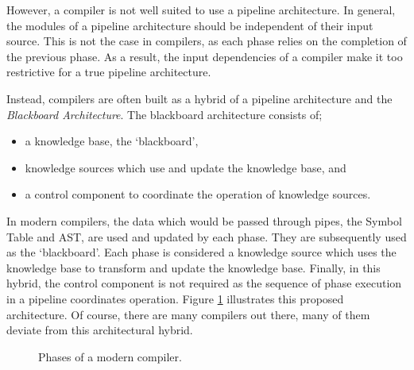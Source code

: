 \documentclass{csse4400}
\begin{document}
However, a compiler is not well suited to use a pipeline architecture.
In general, the modules of a pipeline architecture should be independent of their input source.
This is not the case in compilers, as each phase relies on the completion of the previous phase.
As a result, the input dependencies of a compiler make it too restrictive for a true pipeline architecture.

Instead, compilers are often built as a hybrid of a pipeline architecture and the \textsl{Blackboard Architecture}.
The blackboard architecture consists of;
\begin{itemize}
    \item a knowledge base, the `blackboard',
    \item knowledge sources which use and update the knowledge base, and
    \item a control component to coordinate the operation of knowledge sources.
\end{itemize}

In modern compilers, the data which would be passed through pipes, the Symbol Table and AST,
are used and updated by each phase.
They are subsequently used as the `blackboard'.
Each phase is considered a knowledge source which uses the knowledge base to transform and update the knowledge base.
Finally, in this hybrid, the control component is not required as the sequence of phase execution in a pipeline coordinates operation.
Figure \ref{fig:compiler-architecture-sym} illustrates this proposed architecture.
Of course, there are many compilers out there, many of them deviate from this architectural hybrid.

\begin{figure}[H]
    \centering
{}
\caption{Phases of a modern compiler.}
\label{fig:compiler-architecture-sym}
\end{figure}
\end{document}

